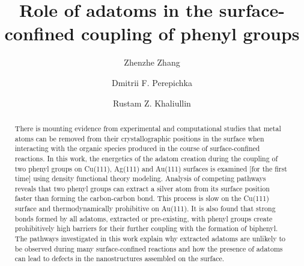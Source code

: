 \documentclass[%
 reprint,
 amsmath,amssymb,
 aps,
prb,
floatfix,
]{revtex4-2}
\newcommand{\comm}{\color{ForestGreen}} %
\begin{document}
\title{Role of adatoms in the surface-confined coupling of phenyl groups}

\author{Zhenzhe Zhang}
\author{Dmitrii F. Perepichka}%
\author{Rustam Z. Khaliullin}
%


\begin{abstract}
There is mounting evidence from experimental and computational studies that metal atoms can be  removed from their crystallographic positions in the surface when interacting with the organic species produced in the course of surface-confined reactions. In this work, the energetics of the adatom creation during the coupling of two phenyl groups on Cu(111), Ag(111) and Au(111) surfaces is examined [for the first time] using density functional theory modeling. Analysis of competing pathways reveals that two phenyl groups can extract a silver atom from its surface position faster than forming the carbon-carbon bond. This process is slow on the Cu(111) surface and thermodynamically prohibitive on Au(111). It is also found that strong bonds formed by all adatoms, extracted or pre-existing, with phenyl groups create prohibitively high barriers for their further coupling with the formation of biphenyl. The pathways investigated in this work explain why extracted adatoms are unlikely to be observed during many surface-confined reactions and how the presence of adatoms can lead to defects in the nanostructures assembled on the surface.
\end{abstract}

\maketitle




\end{document}
